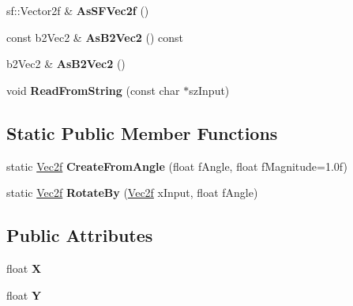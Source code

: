 \begin{DoxyCompactItemize}
\item 
\hypertarget{struct_k_g_e_1_1_vec2f_a50b74040f634a3d78c19a532bd6af796}{sf\-::\-Vector2f \& {\bfseries As\-S\-F\-Vec2f} ()}\label{struct_k_g_e_1_1_vec2f_a50b74040f634a3d78c19a532bd6af796}

\item 
\hypertarget{struct_k_g_e_1_1_vec2f_a4a1c611efeb73173cd9fd9105acfeead}{const b2\-Vec2 \& {\bfseries As\-B2\-Vec2} () const }\label{struct_k_g_e_1_1_vec2f_a4a1c611efeb73173cd9fd9105acfeead}

\item 
\hypertarget{struct_k_g_e_1_1_vec2f_aec2d0ce1bb97c6e86972776b426a0d13}{b2\-Vec2 \& {\bfseries As\-B2\-Vec2} ()}\label{struct_k_g_e_1_1_vec2f_aec2d0ce1bb97c6e86972776b426a0d13}

\item 
\hypertarget{struct_k_g_e_1_1_vec2f_a9a2a8f7ff15e80cb9223ce04b0479915}{void {\bfseries Read\-From\-String} (const char $\ast$sz\-Input)}\label{struct_k_g_e_1_1_vec2f_a9a2a8f7ff15e80cb9223ce04b0479915}

\end{DoxyCompactItemize}
\subsection*{Static Public Member Functions}
\begin{DoxyCompactItemize}
\item 
\hypertarget{struct_k_g_e_1_1_vec2f_a37839e755faa101c9403c1f3858bc10c}{static \hyperlink{struct_k_g_e_1_1_vec2f}{Vec2f} {\bfseries Create\-From\-Angle} (float f\-Angle, float f\-Magnitude=1.\-0f)}\label{struct_k_g_e_1_1_vec2f_a37839e755faa101c9403c1f3858bc10c}

\item 
\hypertarget{struct_k_g_e_1_1_vec2f_aade5b26b17c1bbb68e2c74b1b454fb19}{static \hyperlink{struct_k_g_e_1_1_vec2f}{Vec2f} {\bfseries Rotate\-By} (\hyperlink{struct_k_g_e_1_1_vec2f}{Vec2f} x\-Input, float f\-Angle)}\label{struct_k_g_e_1_1_vec2f_aade5b26b17c1bbb68e2c74b1b454fb19}

\end{DoxyCompactItemize}
\subsection*{Public Attributes}
\begin{DoxyCompactItemize}
\item 
\hypertarget{struct_k_g_e_1_1_vec2f_a31c19904eceee952d34af9f8bf71185c}{float {\bfseries X}}\label{struct_k_g_e_1_1_vec2f_a31c19904eceee952d34af9f8bf71185c}

\item 
\hypertarget{struct_k_g_e_1_1_vec2f_a19f6b7acba72df3e1fca642ed68a80df}{float {\bfseries Y}}\label{struct_k_g_e_1_1_vec2f_a19f6b7acba72df3e1fca642ed68a80df}

\end{DoxyCompactItemize}


